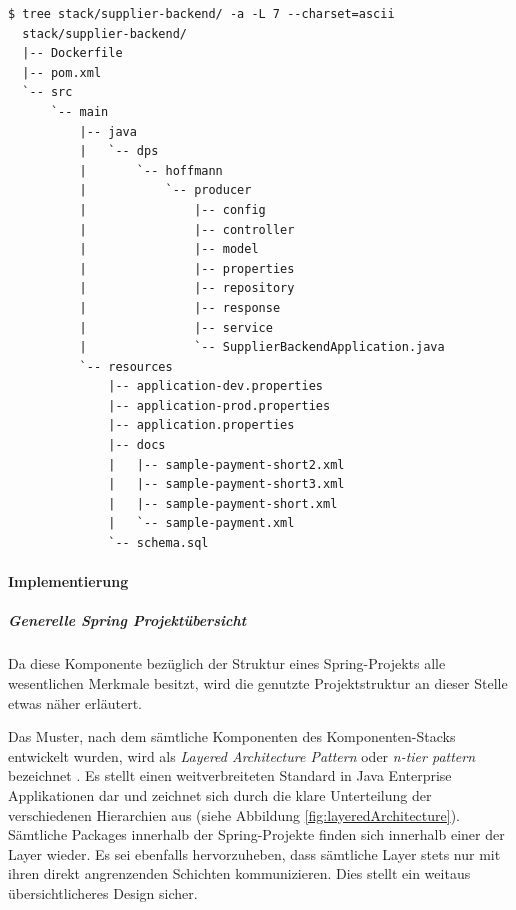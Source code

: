 \label{verb:supplierStruct}
\begin{lstlisting}[caption={Supplier Backend - Struktur},style=bashStyle]
  $ tree stack/supplier-backend/ -a -L 7 --charset=ascii
  stack/supplier-backend/
  |-- Dockerfile
  |-- pom.xml
  `-- src
      `-- main
          |-- java
          |   `-- dps
          |       `-- hoffmann
          |           `-- producer
          |               |-- config
          |               |-- controller
          |               |-- model
          |               |-- properties
          |               |-- repository
          |               |-- response
          |               |-- service
          |               `-- SupplierBackendApplication.java
          `-- resources
              |-- application-dev.properties
              |-- application-prod.properties
              |-- application.properties
              |-- docs
              |   |-- sample-payment-short2.xml
              |   |-- sample-payment-short3.xml
              |   |-- sample-payment-short.xml
              |   `-- sample-payment.xml
              `-- schema.sql

\end{lstlisting}


\paragraph{Implementierung}

\subparagraph{Generelle Spring Projektübersicht}
Da diese Komponente bezüglich der Struktur eines Spring-Projekts alle wesentlichen Merkmale besitzt, wird die genutzte Projektstruktur an dieser Stelle etwas näher erläutert. 


Das Muster, nach dem sämtliche Komponenten des Komponenten-Stacks entwickelt wurden, wird als \emph{Layered Architecture Pattern} oder \emph{n-tier pattern} bezeichnet \cite{oreilly-layered-arch}. Es stellt einen weitverbreiteten Standard in Java Enterprise Applikationen dar und zeichnet sich durch die klare Unterteilung der verschiedenen Hierarchien aus (siehe Abbildung \ref{fig:layeredArchitecture}). Sämtliche Packages innerhalb der Spring-Projekte finden sich innerhalb einer der Layer wieder. Es sei ebenfalls hervorzuheben, dass sämtliche Layer stets nur mit ihren direkt angrenzenden Schichten kommunizieren. Dies stellt ein weitaus übersichtlicheres Design sicher.

